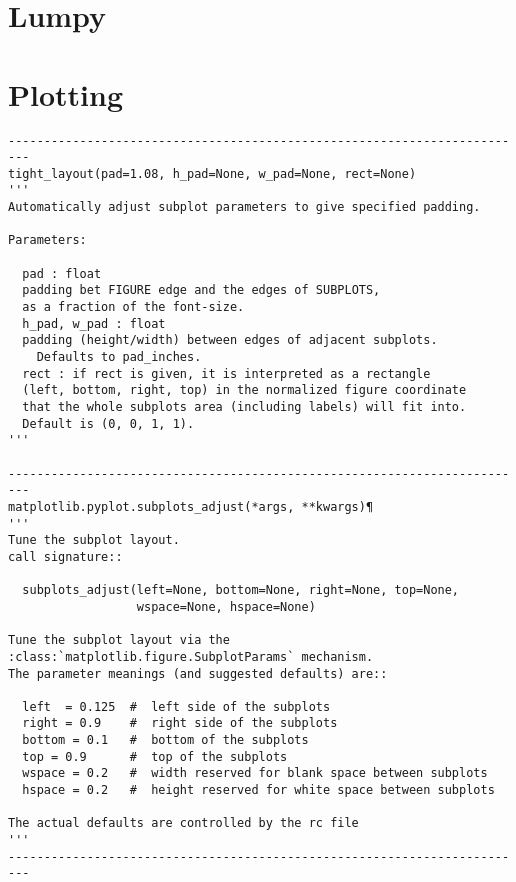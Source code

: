 \documentclass{article}
\begin{document}
\section{Lumpy}

\section{Plotting}
\begin{verbatim}
-------------------------------------------------------------------------
tight_layout(pad=1.08, h_pad=None, w_pad=None, rect=None)
'''
Automatically adjust subplot parameters to give specified padding.

Parameters:

  pad : float
  padding bet FIGURE edge and the edges of SUBPLOTS,
  as a fraction of the font-size.
  h_pad, w_pad : float
  padding (height/width) between edges of adjacent subplots.
    Defaults to pad_inches.
  rect : if rect is given, it is interpreted as a rectangle
  (left, bottom, right, top) in the normalized figure coordinate
  that the whole subplots area (including labels) will fit into.
  Default is (0, 0, 1, 1).
'''

-------------------------------------------------------------------------
matplotlib.pyplot.subplots_adjust(*args, **kwargs)¶
'''
Tune the subplot layout.
call signature::

  subplots_adjust(left=None, bottom=None, right=None, top=None,
                  wspace=None, hspace=None)

Tune the subplot layout via the
:class:`matplotlib.figure.SubplotParams` mechanism.
The parameter meanings (and suggested defaults) are::

  left  = 0.125  #  left side of the subplots
  right = 0.9    #  right side of the subplots
  bottom = 0.1   #  bottom of the subplots
  top = 0.9      #  top of the subplots
  wspace = 0.2   #  width reserved for blank space between subplots
  hspace = 0.2   #  height reserved for white space between subplots

The actual defaults are controlled by the rc file
'''
-------------------------------------------------------------------------
\end{verbatim}
\end{document}
